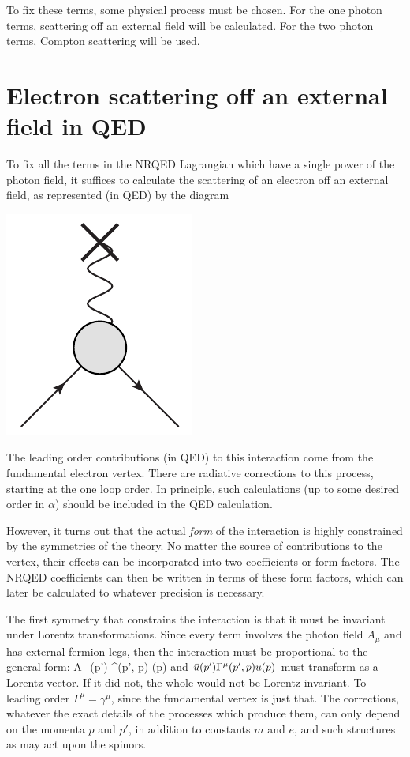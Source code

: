 To fix these terms, some physical process must be chosen.  For the one photon terms, scattering off an external field will be calculated.  For the two photon terms, Compton scattering will be used.

\section{Electron scattering off an external field in QED}
To fix all the terms in the NRQED Lagrangian which have a single power of the photon field, it suffices to calculate the scattering of an electron off an external field, as represented (in QED) by the diagram

   \includegraphics[scale=0.8]{eps/blob-wave} 


The leading order contributions (in QED) to this interaction come from the fundamental electron vertex.  There are radiative corrections to this process, starting at the one loop order.  In principle, such calculations (up to some desired order in $\alpha$) should be included in the QED calculation.  

However, it turns out that the actual \emph{form} of the interaction is highly constrained by the symmetries of the theory.  No matter the source of contributions to the vertex, their effects can be incorporated into two coefficients or form factors.  The NRQED coefficients can then be written in terms of these form factors, which can later be calculated to whatever precision is necessary.  

The first symmetry that constrains the interaction is that it must be invariant under Lorentz transformations.  Since every term involves the photon field $A_\mu$ and has external fermion legs, then the interaction must be proportional to the general form:
\beq
	A_\mu \srb(p') \Gamma^\mu(p', p) \sr(p) 
\eeq 	
and $\bar{u}(p') \Gamma^\mu(p', p) u(p) $ must transform as a Lorentz vector.  If it did not, the whole would not be Lorentz invariant.  To leading order $\Gamma^\mu = \gamma^\mu$, since the fundamental vertex is just that.  The corrections, whatever the exact details of the processes which produce them, can only depend on the momenta $p$ and $p'$, in addition to constants $m$ and $e$, and such structures as may act upon the spinors.

